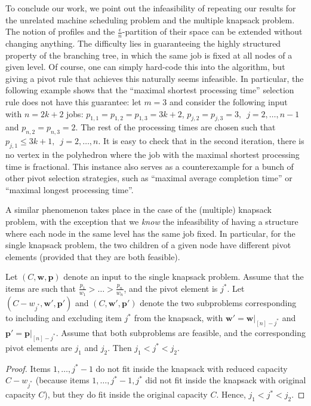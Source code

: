 \documentclass[a4paper,UKenglish,cleveref, autoref, thm-restate, pdfa]{lipics-v2021}
\theoremstyle{plain}
\begin{document}
To conclude our work, we point out the infeasibility of repeating our results for the unrelated machine scheduling problem and the multiple knapsack problem. The notion of profiles and the $\frac{\epsilon}{n}$-partition of their space can be extended without changing anything. The difficulty lies in guaranteeing the highly structured property of the branching tree, in which the same job is fixed at all nodes of a given level. Of course, one can simply hard-code this into the algorithm, but giving a pivot rule that achieves this naturally seems infeasible. In particular, the following example shows that the ``maximal shortest processing time'' selection rule does not have this guarantee: let $m = 3$ and consider the following input with $n=2k+2$ jobs: $p_{1,1} = p_{1,2}=p_{1,3} = 3k+2$, $p_{j,2} = p_{j,3} = 3, \,\,\, j= 2, \ldots, n-1$ and $p_{n,2} = p_{n,3} = 2$. The rest of the processing times are chosen such that $p_{j,1} \le 3k+1, \,\,\, j = 2, \ldots, n$. It is easy to check that in the second iteration, there is no vertex in the polyhedron where the job with the maximal shortest processing time is fractional. This instance also serves as a counterexample for a bunch of other pivot selection strategies, such as ``maximal average completion time'' or ``maximal longest processing time''.

A similar phenomenon takes place in the case of the (multiple) knapsack problem, with the exception that we \emph{know} the infeasibility of having a structure where each node in the same level has the same job fixed. In particular, for the single knapsack problem, the two children of a given node have different pivot elements (provided that they are both feasible).

\begin{lemma}
    Let $(C, \bm{w}, \bm{p})$ denote an input to the single knapsack problem. Assume that the items are such that $\frac{p_1}{w_1} > \ldots > \frac{p_n}{w_n}$, and the pivot element is $j^*$. Let $(C-w_{j^*}, \bm{w}', \bm{p}')$ and $(C, \bm{w}', \bm{p}')$ denote the two subproblems corresponding to including and excluding item $j^*$ from the knapsack, with $\bm{w}' = \bm{w}|_{[n]-j^*}$ and $\bm{p}' = \bm{p}|_{[n]-j^*}$. Assume that both subproblems are feasible, and the corresponding pivot elements are $j_1$ and $j_2$. Then $j_1 < j^* < j_2$.
\end{lemma}

\begin{proof}
    Items $1, \ldots, j^* -1$ do not fit inside the knapsack with reduced capacity $C-w_{j^*}$ (because items $1, \ldots, j^*-1, j^*$ did not fit inside the knapsack with original capacity $C$), but they do fit inside the original capacity $C$. Hence, $j_1 < j^* < j_2$.
\end{proof} 
\end{document}
